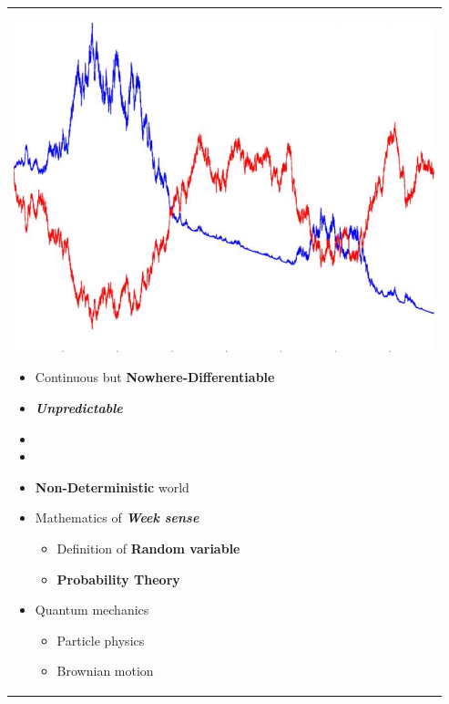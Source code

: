 \documentclass[12pt,a4paper]{article}
\theoremstyle{definition}
\theoremstyle{definition}
\theoremstyle{definition}
\theoremstyle{definition}
\theoremstyle{remark}
\theoremstyle{definition}
\begin{document}
\hfill
\begin{minipage}{0.49\textwidth}
	\begin{tabular}{|p{\textwidth}}
		\begin{center}
			\includegraphics[width=.8\linewidth,height=.13\textheight]{nowhere-differentiable.png}
		\end{center}
		\begin{itemize}
			\item Continuous but \textbf{Nowhere-Differentiable}
			\item \textbf{\textit{Unpredictable}}
			\item[]
			\item[]
			\item \textbf{Non-Deterministic} world
			\item Mathematics of \textbf{\textit{Week sense}}\begin{itemize}
				\item Definition of \textbf{Random variable}
				\item \textbf{Probability Theory}
			\end{itemize}
			\item Quantum mechanics\begin{itemize}
				\item Particle physics
				\item Brownian motion
			\end{itemize}
		\end{itemize}
	\end{tabular}
\end{minipage}%
\end{document}
